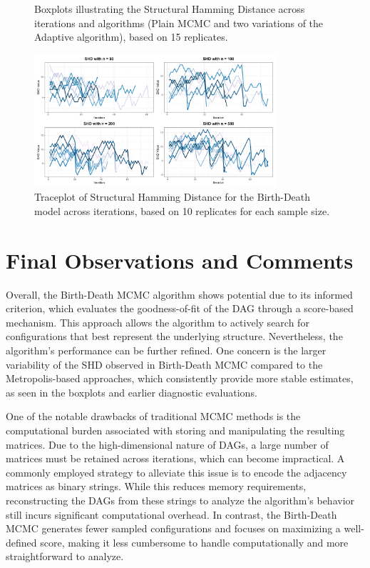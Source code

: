 \documentclass{report}
\begin{document}
\begin{figure}[!ht]
	\caption{Boxplots illustrating the Structural Hamming Distance across iterations and algorithms (Plain MCMC and two variations of the Adaptive algorithm), based on 15 replicates.}
	\label{fig:box-shd-final}
\end{figure}

\begin{figure}[h] 
	\centering
	\includegraphics[width=0.8\textwidth]{Figures/Overall_comparison/trace_shd_iters_BD.png}
	\caption{Traceplot of Structural Hamming Distance for the Birth-Death model across iterations, based on 10 replicates for each sample size.}
	\label{fig:trace-shd-BD}
\end{figure}

\section{Final Observations and Comments}

Overall, the Birth-Death MCMC algorithm shows potential due to its informed criterion, which evaluates the goodness-of-fit of the DAG through a score-based mechanism. This approach allows the algorithm to actively search for configurations that best represent the underlying structure. Nevertheless, the algorithm's performance can be further refined. One concern is the larger variability of the SHD observed in Birth-Death MCMC compared to the Metropolis-based approaches, which consistently provide more stable estimates, as seen in the boxplots and earlier diagnostic evaluations.

One of the notable drawbacks of traditional MCMC methods is the computational burden associated with storing and manipulating the resulting matrices. Due to the high-dimensional nature of DAGs, a large number of matrices must be retained across iterations, which can become impractical. A commonly employed strategy to alleviate this issue is to encode the adjacency matrices as binary strings. While this reduces memory requirements, reconstructing the DAGs from these strings to analyze the algorithm's behavior still incurs significant computational overhead. In contrast, the Birth-Death MCMC generates fewer sampled configurations and focuses on maximizing a well-defined score, making it less cumbersome to handle computationally and more straightforward to analyze.
\end{document}
